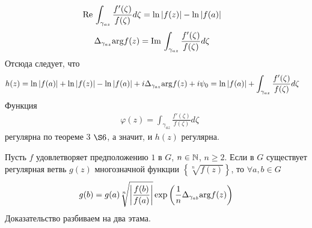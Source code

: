 \begin{itemize}
    \begin{align*}
      & \mathrm{Re}\, \int_{\gamma_{az}}\frac{f'(\zeta)}{f(\zeta)}d\zeta = \ln \left| f(z) \right| - \ln \left| f(a) \right|
    \end{align*}
    \begin{align*}
      & \Delta_{\gamma_{az}}\mathrm{arg} f(z) = \mathrm{Im}\, \int_{\gamma_{az}}\frac{f'(\zeta)}{f(\zeta)}d\zeta
    \end{align*}
    Отсюда следует, что
    \begin{align*}
      & h(z) = \ln \left| f(a) \right| + \ln \left| f(z) \right| - \ln \left| f(a) \right| + i \Delta_{\gamma_{az}} \mathrm{arg} f(z) + i \psi_0 = \ln \left| f(a) \right| + \int_{\gamma_{az}}\frac{f'(\zeta)}{f(\zeta)}d \zeta
    \end{align*}
    Функция
    \begin{align*}
      & \varphi(z) = \int_{\gamma_{az}}\frac{f'(\zeta)}{f(\zeta)}d\zeta
    \end{align*}
    регулярна по теореме $3$ $\S 6$, а значит, и $h(z)$ регулярна.
\end{itemize}
\lemma
Пусть $f$ удовлетворяет предположению $1$ в $G$, $n \in \mathbb{N}$, $n \geq 2$. Если в
$G$ существует регулярная ветвь $g(z)$ многозначной функции $\left\{
    \sqrt[n]{f(z)} \right\}$, то $\forall a, b \in G$
\begin{equation}\label{(16.14)}
    g(b) = g(a) \sqrt[n]{\left| \frac{f(b)}{f(a)} \right|}\exp \left( \frac{1}{n}\Delta_{\gamma_{ab}}\mathrm{arg} f(z) \right)
\end{equation}
\pr Доказательство разбиваем на два этама.
